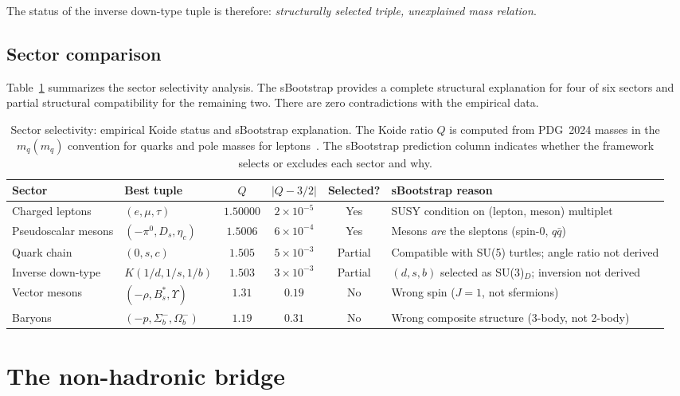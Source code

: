 \documentclass[prd,twocolumn,superscriptaddress,nofootinbib]{revtex4-2}
\begin{document}
The status of the inverse down-type tuple is therefore: \emph{structurally
selected triple, unexplained mass relation}.

\subsection{Sector comparison}
\label{sec:comparison}

Table~\ref{tab:sectors} summarizes the sector selectivity analysis.  The
sBootstrap provides a complete structural explanation for four of six
sectors and partial structural compatibility for the remaining two.
There are zero contradictions with the empirical data.

\begin{table}[t]
\centering
\caption{Sector selectivity: empirical Koide status and sBootstrap
  explanation.  The Koide ratio $Q$ is computed from PDG~2024 masses
  in the $m_q(m_q)$ convention for quarks and pole masses for
  leptons~\cite{PDG2024}.  The sBootstrap prediction column indicates
  whether the framework selects or excludes each sector and why.}
\label{tab:sectors}
\begin{tabular}{@{}llcccl@{}}
\toprule
Sector & Best tuple & $Q$ & $|Q-3/2|$
  & Selected? & sBootstrap reason \\
\midrule
Charged leptons & $(e,\mu,\tau)$
  & $1.50000$ & $2\times 10^{-5}$
  & Yes & SUSY condition on (lepton, meson) multiplet \\
Pseudoscalar mesons & $(-\pi^0,D_s,\eta_c)$
  & $1.5006$ & $6\times 10^{-4}$
  & Yes & Mesons \emph{are} the sleptons (spin-0, $q\bar{q}$) \\
Quark chain & $(0,s,c)$
  & $1.505$ & $5\times 10^{-3}$
  & Partial & Compatible with SU(5) turtles; angle ratio not derived \\
Inverse down-type & $K(1/d,1/s,1/b)$
  & $1.503$ & $3\times 10^{-3}$
  & Partial & $(d,s,b)$ selected as SU(3)$_D$; inversion not derived \\
Vector mesons & $(-\rho,B_s^*,\Upsilon)$
  & $1.31$ & $0.19$
  & No & Wrong spin ($J=1$, not sfermions) \\
Baryons & $(-p,\Sigma_b^-,\Omega_b^-)$
  & $1.19$ & $0.31$
  & No & Wrong composite structure (3-body, not 2-body) \\
\bottomrule
\end{tabular}
\end{table}

\section{The non-hadronic bridge}
\label{sec:bridge}
\end{document}
